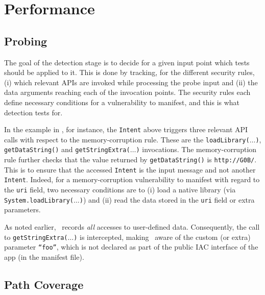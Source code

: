 \section{Performance}

\subsection{Probing}

The goal of the detection stage is to decide for a given input point which tests should be applied to it. This is done by tracking, for the different security rules, (i) which relevant APIs are invoked while processing the probe input and (ii) the data arguments reaching each of the invocation points. The security rules each define necessary conditions for a vulnerability to manifest, and this is what detection tests for.

In the example in , for instance, the {\tt Intent} above triggers three relevant API calls with respect to the memory-corruption rule. These are the {\tt loadLibrary($\ldots$)}, {\tt getDataString()} and {\tt getStringExtra($\ldots$)} invocations. The memory-corruption rule further checks that the value returned by {\tt getDataString()} is {\tt http://G0B/}. This is to ensure that the accessed {\tt Intent} is the input message and not another {\tt Intent}. Indeed, for a memory-corruption vulnerability to manifest with regard to the {\tt uri} field, two necessary conditions are to (i) load a native library (via {\tt System.loadLibrary($\ldots$)}) and (ii) read the data stored in the {\tt uri} field or extra parameters.

As noted earlier, \Tool\ records \emph{all} accesses to user-defined data. Consequently, the call to {\tt getStringExtra($\ldots$)} is intercepted, making \Tool\ aware of the custom (or extra) parameter {\tt ``foo''}, which is not declared as part of the public IAC interface of the app (in the manifest file).

\subsection{Path Coverage}

